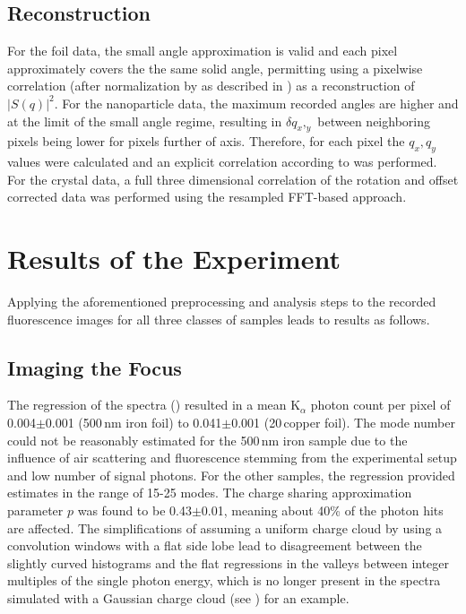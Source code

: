 \subsection{Reconstruction}
For the foil data, the small angle approximation is valid and each pixel approximately covers the the same solid angle, permitting using a pixelwise correlation (after normalization by as described in ) as a reconstruction of $|S(q)|^2$.
For the nanoparticle data, the maximum recorded angles are higher and at the limit of the small angle regime, resulting in $\delta q_x,_y$ between neighboring pixels being lower for pixels further of axis. Therefore, for each pixel the $q_x,q_y$ values were calculated and an explicit correlation according to  was performed.
For the crystal data, a full three dimensional correlation of the rotation and offset corrected data was performed using the resampled FFT-based approach.


\section{Results of the Experiment}
Applying the aforementioned preprocessing and analysis steps to the recorded fluorescence images for all three classes of samples leads to results as follows. 
\subsection{Imaging the Focus}

The regression of the spectra () resulted in a mean K$_{\alpha}$ photon count per pixel of 0.004$\pm$0.001 (500\,nm iron foil) to 0.041$\pm$0.001 (20\,\micrometer copper foil). The mode number could not be reasonably estimated for the 500\,nm iron sample due to the influence of air scattering and fluorescence stemming from the experimental setup and low number of signal photons. For the other samples, the regression provided estimates in the range of 15-25 modes. The charge sharing approximation parameter $p$ was found to be 0.43$\pm$0.01, meaning about 40\% of the photon hits are affected. The simplifications of assuming a uniform charge cloud by using a convolution windows with a flat side lobe lead to disagreement between the slightly curved histograms and the flat regressions in the valleys between integer multiples of the single photon energy, which is no longer present in the spectra simulated with a Gaussian charge cloud (see ) for an example.

